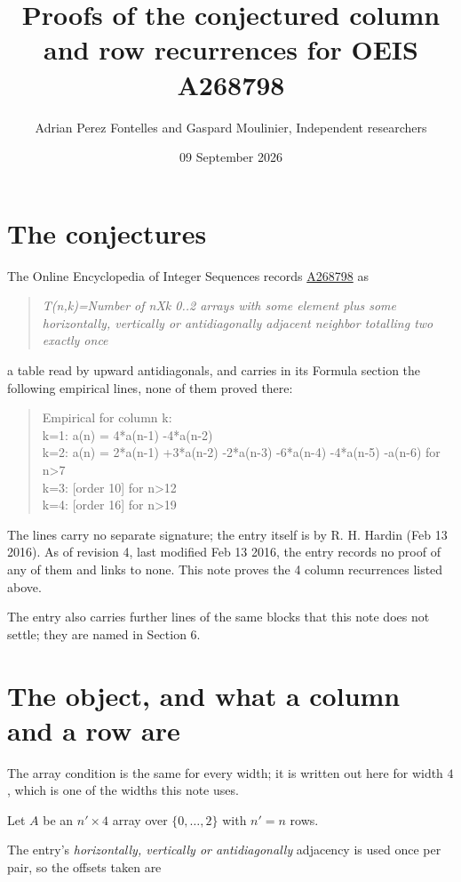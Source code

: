 \documentclass[11pt]{article}
\title{Proofs of the conjectured column and row recurrences for OEIS A268798}
\author{Adrian Perez Fontelles and Gaspard Moulinier, Independent researchers}
\date{09 September 2026}
\theoremstyle{definition}
\begin{document}
\maketitle
\section{The conjectures}

The Online Encyclopedia of Integer Sequences records \href{https://oeis.org/A268798}{A268798} as

\begin{quote}\itshape T(n,k)=Number of nXk 0..2 arrays with some element plus some horizontally, vertically or antidiagonally adjacent neighbor totalling two exactly once\end{quote}

a table read by upward antidiagonals, and carries in its Formula section the following empirical lines, none of them proved there:

\begin{quote}\ttfamily Empirical for column k:\\
k=1: a(n) = 4*a(n-1) -4*a(n-2)\\k=2: a(n) = 2*a(n-1) +3*a(n-2) -2*a(n-3) -6*a(n-4) -4*a(n-5) -a(n-6) for n>7\\k=3: [order 10] for n>12\\k=4: [order 16] for n>19\end{quote}

The lines carry no separate signature; the entry itself is by R. H. Hardin (Feb 13 2016). As of revision 4, last modified Feb 13 2016, the entry records no proof of any of them and links to none. This note proves the 4 column recurrences listed above.

The entry also carries further lines of the same blocks that this note does not settle; they are named in Section 6.

\section{The object, and what a column and a row are}

The array condition is the same for every width; it is written out here for width $4$, which is one of the widths this note uses.

Let $A$ be an $n' \times 4$ array over $\{0,\dots,2\}$ with $n' = n$ rows.

The entry's {\itshape horizontally, vertically or antidiagonally} adjacency is used once per pair, so the offsets taken are
\end{document}
